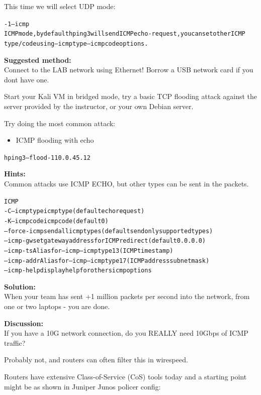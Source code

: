 \documentclass[a4paper,11pt,notitlepage]{report}
\begin{document}
This time we will select UDP mode:

\begin{alltt}\footnotesize
-1 --icmp
       ICMP  mode,  by  default  hping3  will  send  ICMP echo-request, you can set other ICMP
       type/code using --icmptype --icmpcode options.
\end{alltt}

{\bf Suggested method:}\\
Connect to the LAB network using Ethernet! Borrow a USB network card if you dont have one.

Start your Kali VM in bridged mode, try a basic TCP flooding attack against the server provided by the instructor, or your own Debian server.

Try doing the most common attack:
\begin{itemize}
\item ICMP flooding with echo
\end{itemize}

\begin{alltt}\footnotesize
hping3 --flood -1 10.0.45.12
\end{alltt}





{\bf Hints:}\\
Common attacks use ICMP ECHO, but other types can be sent in the packets.

\begin{alltt}\footnotesize
ICMP
  -C  --icmptype   icmp type (default echo request)
  -K  --icmpcode   icmp code (default 0)
      --force-icmp send all icmp types (default send only supported types)
      --icmp-gw    set gateway address for ICMP redirect (default 0.0.0.0)
      --icmp-ts    Alias for --icmp --icmptype 13 (ICMP timestamp)
      --icmp-addr  Alias for --icmp --icmptype 17 (ICMP address subnet mask)
      --icmp-help  display help for others icmp options
\end{alltt}


{\bf Solution:}\\
When your team has sent +1 million packets per second into the network, from one or two laptops - you are done.

{\bf Discussion:}\\
If you have a 10G network connection, do you REALLY need 10Gbps of ICMP traffic?

Probably not, and routers can often filter this in wirespeed.

Routers have extensive Class-of-Service (CoS) tools today and a starting point might be as shown in Juniper Junos policer config:
\end{document}
